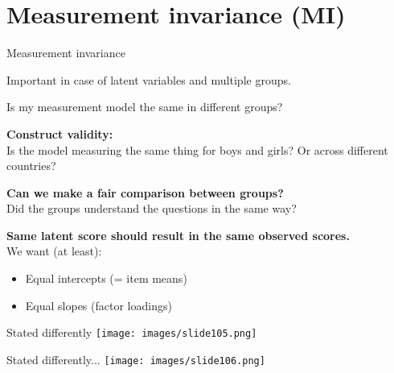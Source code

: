 \documentclass[10pt]{beamer}\usepackage[]{graphicx}\usepackage[]{xcolor}
\begin{document}
\section{Measurement invariance (MI)}
%
%
\begin{frame}{Measurement invariance}

Important in case of latent variables and multiple groups. 
    
\end{frame}
%
\begin{frame}{Is my measurement model the same in different groups?}

\textbf{Construct validity:} \\
Is the model measuring the same thing for boys and girls? Or across different countries? 

\vspace{5mm}

\textbf{Can we make a fair comparison between groups?} \\
Did the groups understand the questions in the same way? 

\vspace{5mm}

\textbf{Same latent score should result in the same observed scores.}\\
We want (at least):
\begin{itemize}
    \item Equal intercepts (= item means)
    \item Equal slopes (factor loadings)
\end{itemize}

\end{frame}
%
\begin{frame}{Stated differently}
    \texttt{[image: images/slide105.png]}
\end{frame}

\begin{frame}{Stated differently...}
    \texttt{[image: images/slide106.png]}
\end{frame}
\end{document}
